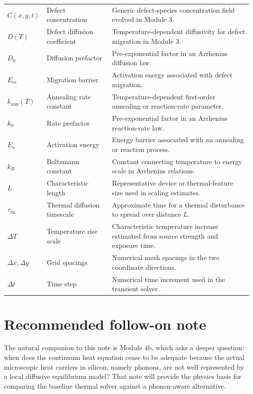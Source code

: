 \documentclass[11pt]{article}
\newcommand{\ann}{k_{\mathrm{ann}}}
\begin{document}
\begin{longtable}{p{} p{} p{}}
$C(x,y,t)$ & Defect concentration & Generic defect-species concentration field evolved in Module 3. \\
$D(T)$ & Defect diffusion coefficient & Temperature-dependent diffusivity for defect migration in Module 3. \\
$D_0$ & Diffusion prefactor & Pre-exponential factor in an Arrhenius diffusion law. \\
$E_m$ & Migration barrier & Activation energy associated with defect migration. \\
$\ann(T)$ & Annealing rate constant & Temperature-dependent first-order annealing or reaction-rate parameter. \\
$k_0$ & Rate prefactor & Pre-exponential factor in an Arrhenius reaction-rate law. \\
$E_a$ & Activation energy & Energy barrier associated with an annealing or reaction process. \\
$k_B$ & Boltzmann constant & Constant connecting temperature to energy scale in Arrhenius relations. \\
$L$ & Characteristic length & Representative device or thermal-feature size used in scaling estimates. \\
$\tau_{\mathrm{th}}$ & Thermal diffusion timescale & Approximate time for a thermal disturbance to spread over distance $L$. \\
$\Delta T$ & Temperature rise scale & Characteristic temperature increase estimated from source strength and exposure time. \\
$\Delta x,\Delta y$ & Grid spacings & Numerical mesh spacings in the two coordinate directions. \\
$\Delta t$ & Time step & Numerical time increment used in the transient solver. \\
\bottomrule
\end{longtable}

\section{Recommended follow-on note}

The natural companion to this note is Module 4b, which asks a deeper question: when does the continuum heat equation cease to be adequate because the actual microscopic heat carriers in silicon, namely phonons, are not well represented by a local diffusive equilibrium model? That note will provide the physics basis for comparing the baseline thermal solver against a phonon-aware alternative.
\end{document}
